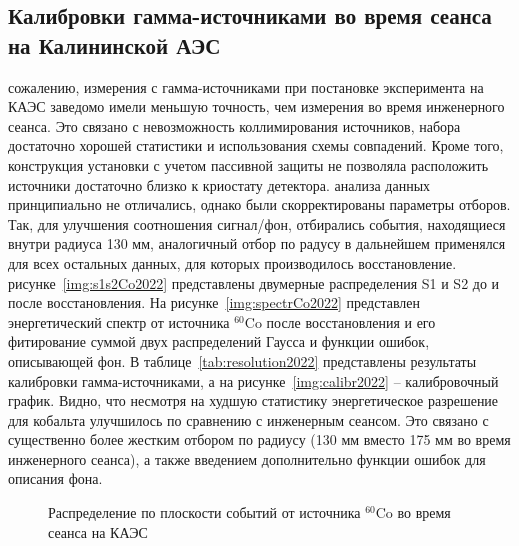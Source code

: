 \subsection{Калибровки гамма-источниками во время сеанса на Калининской АЭС}
\label{subsect3_3_5}

 
 сожалению, измерения с гамма-источниками при постановке эксперимента на КАЭС заведомо имели меньшую точность, чем измерения во время инженерного сеанса. Это связано с невозможность коллимирования источников, набора достаточно хорошей статистики и использования схемы совпадений. Кроме того, конструкция установки с учетом пассивной защиты не позволяла расположить источники достаточно близко к криостату детектора.
 анализа данных принципиально не отличались, однако были скорректированы параметры отборов. Так, для улучшения соотношения сигнал/фон, отбирались события, находящиеся внутри радиуса 130 мм, аналогичный отбор по радусу в дальнейшем применялся для всех остальных данных, для которых производилось восстановление.
 рисунке~\ref{img:s1s2Co2022} представлены двумерные распределения S1 и S2 до и после восстановления. На рисунке~\ref{img:spectrCo2022} представлен энергетический спектр от источника $^{60}$Co после восстановления и его фитирование суммой двух распределений Гаусса и функции ошибок, описывающей фон. В таблице~\ref{tab:resolution2022} представлены результаты калибровки гамма-источниками, а на рисунке~\ref{img:calibr2022} -- калибровочный график. Видно, что несмотря на худшую статистику энергетическое разрешение для кобальта улучшилось по сравнению с инженерным сеансом. Это связано с существенно более жестким отбором по радиусу (130 мм вместо 175 мм во время инженерного сеанса), а также введением дополнительно функции ошибок для описания фона.
\begin{figure}[H]
  \caption{Распределение по плоскости событий от источника $^{60}$Co во время сеанса на КАЭС}
  \label{img:xyCo2022}  
\end{figure}

